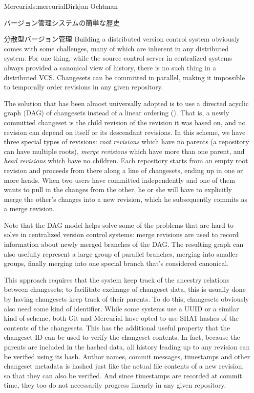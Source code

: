 \begin{aosachapter}{Mercurial}{s:mercurial}{Dirkjan Ochtman}
\begin{aosasect1}{バージョン管理システムの簡単な歴史}
\begin{aosasect2}{分散型バージョン管理}
Building a distributed version control system obviously comes with
some challenges, many of which are inherent in any distributed
system. For one thing, while the source control server in centralized
systems always provided a canonical view of history, there is no such
thing in a distributed VCS\@. Changesets can be committed in parallel,
making it impossible to temporally order revisions in any given
repository.

The solution that has been almost universally adopted is to use a
directed acyclic graph (DAG) of changesets instead of a linear
ordering (). That is, a newly committed
changeset is the child revision of the revision it was based on, and
no revision can depend on itself or its descendant revisions. In this
scheme, we have three special types of revisions: \emph{root
revisions} which have no parents (a repository can have multiple
roots), \emph{merge revisions} which have more than one parent, and
\emph{head revisions} which have no children. Each repository starts
from an empty root revision and proceeds from there along a line of
changesets, ending up in one or more heads. When two users have
committed independently and one of them wants to pull in the changes
from the other, he or she will have to explicitly merge the other's
changes into a new revision, which he subsequently commits as a merge
revision.


Note that the DAG model helps solve some of the problems that are hard
to solve in centralized version control systems: merge revisions are used to
record information about newly merged branches of the DAG. The
resulting graph can also usefully represent a large group of parallel
branches, merging into smaller groups, finally merging into one
special branch that's considered canonical.

This approach requires that the system keep track of the ancestry
relations between changesets; to facilitate exchange of changeset data,
this is usually done by having changesets keep track of their
parents. To do this, changesets obviously also need some kind of
identifier. While some systems use a UUID or a similar kind of scheme,
both Git and Mercurial have opted to use SHA1 hashes of the contents
of the changesets. This has the additional useful property that the
changeset ID can be used to verify the changeset contents. In fact,
because the parents are included in the hashed data, all history
leading up to any revision can be verified using its hash. Author
names, commit messages, timestamps and other changeset metadata is
hashed just like the actual file contents of a new revision, so that
they can also be verified. And since timestamps are recorded at commit
time, they too do not necessarily progress linearly in any given
repository.


\end{aosasect2}
\end{aosasect1}
\end{aosachapter}
